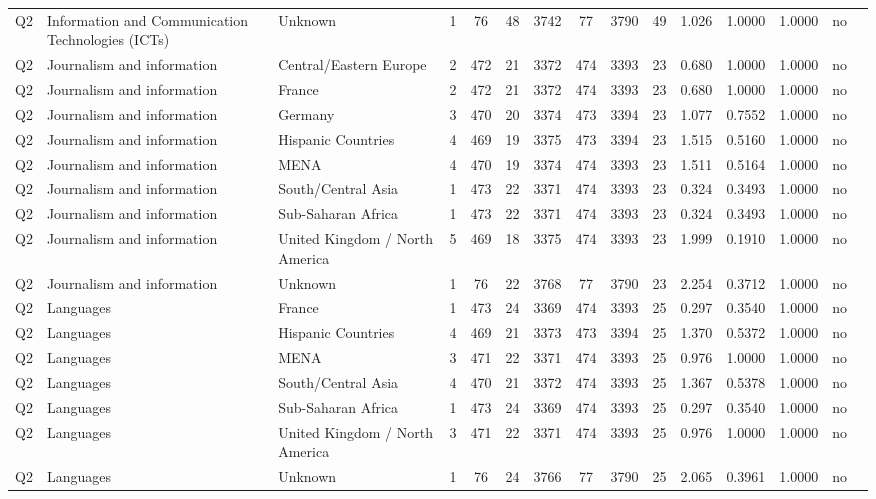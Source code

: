 \begin{longtable}{lllrcccccccccll}
Q2 & Information and Communication Technologies (ICTs) & Unknown & 1 & 76 & 48 & 3742 & 77 & 3790 & 49 & 1.026 & 1.0000 & 1.0000 & no \\
Q2 & Journalism and information & Central/Eastern Europe & 2 & 472 & 21 & 3372 & 474 & 3393 & 23 & 0.680 & 1.0000 & 1.0000 & no \\
Q2 & Journalism and information & France & 2 & 472 & 21 & 3372 & 474 & 3393 & 23 & 0.680 & 1.0000 & 1.0000 & no \\
Q2 & Journalism and information & Germany & 3 & 470 & 20 & 3374 & 473 & 3394 & 23 & 1.077 & 0.7552 & 1.0000 & no \\
Q2 & Journalism and information & Hispanic Countries & 4 & 469 & 19 & 3375 & 473 & 3394 & 23 & 1.515 & 0.5160 & 1.0000 & no \\
Q2 & Journalism and information & MENA & 4 & 470 & 19 & 3374 & 474 & 3393 & 23 & 1.511 & 0.5164 & 1.0000 & no \\
Q2 & Journalism and information & South/Central Asia & 1 & 473 & 22 & 3371 & 474 & 3393 & 23 & 0.324 & 0.3493 & 1.0000 & no \\
Q2 & Journalism and information & Sub-Saharan Africa & 1 & 473 & 22 & 3371 & 474 & 3393 & 23 & 0.324 & 0.3493 & 1.0000 & no \\
Q2 & Journalism and information & United Kingdom / North America & 5 & 469 & 18 & 3375 & 474 & 3393 & 23 & 1.999 & 0.1910 & 1.0000 & no \\
Q2 & Journalism and information & Unknown & 1 & 76 & 22 & 3768 & 77 & 3790 & 23 & 2.254 & 0.3712 & 1.0000 & no \\
Q2 & Languages & France & 1 & 473 & 24 & 3369 & 474 & 3393 & 25 & 0.297 & 0.3540 & 1.0000 & no \\
Q2 & Languages & Hispanic Countries & 4 & 469 & 21 & 3373 & 473 & 3394 & 25 & 1.370 & 0.5372 & 1.0000 & no \\
Q2 & Languages & MENA & 3 & 471 & 22 & 3371 & 474 & 3393 & 25 & 0.976 & 1.0000 & 1.0000 & no \\
Q2 & Languages & South/Central Asia & 4 & 470 & 21 & 3372 & 474 & 3393 & 25 & 1.367 & 0.5378 & 1.0000 & no \\
Q2 & Languages & Sub-Saharan Africa & 1 & 473 & 24 & 3369 & 474 & 3393 & 25 & 0.297 & 0.3540 & 1.0000 & no \\
Q2 & Languages & United Kingdom / North America & 3 & 471 & 22 & 3371 & 474 & 3393 & 25 & 0.976 & 1.0000 & 1.0000 & no \\
Q2 & Languages & Unknown & 1 & 76 & 24 & 3766 & 77 & 3790 & 25 & 2.065 & 0.3961 & 1.0000 & no \\

\end{longtable}
